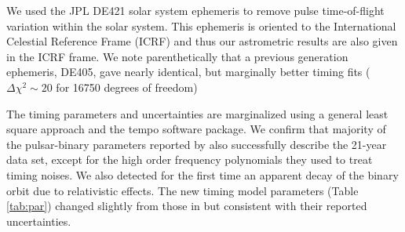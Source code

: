 We used the JPL DE421 solar system ephemeris \citep{fwb09} to remove pulse
time-of-flight variation within the solar system. This ephemeris is oriented
to the International Celestial Reference Frame (ICRF) and thus our astrometric
results are also given in the ICRF frame. We note parenthetically that a
previous generation ephemeris, DE405, gave nearly identical, but marginally
better timing fits ($\Delta\chi^2\sim20$ for 16750 degrees of freedom)



The timing parameters and uncertainties are marginalized using a general least
square approach and the {\sc tempo} software package. 
We confirm that majority of the pulsar-binary parameters reported by
\citet{sns+05} also successfully describe the 21-year data set, except for the
high order frequency polynomials they used to treat timing noises. We also
detected for the first time an apparent decay of the binary orbit due to
relativistic effects.
The new timing model parameters (Table \ref{tab:par}) changed slightly from
those in \citet{sns+05} but consistent with their reported uncertainties.



